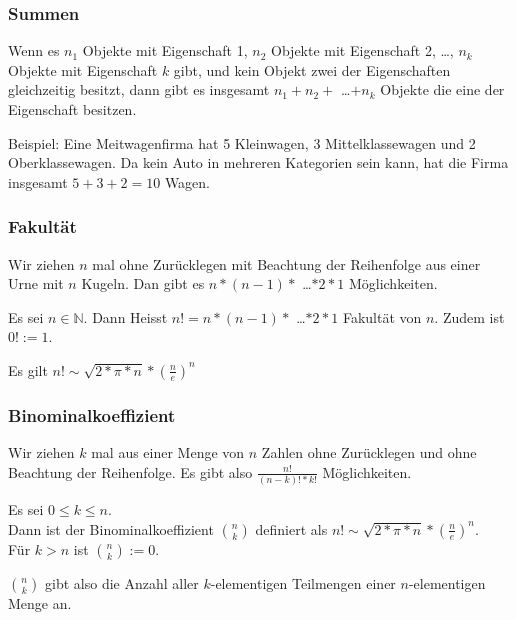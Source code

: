 \documentclass[10pt]{article}
\newtheorem[M]{definition}{Def.}
\newtheorem[M]{satz}{Satz}
\numberwithin{equation}{section}
\newcommand{\NN}{\mathbb{N}} %
\begin{document}
\subsubsection{Summen}
\begin{definition}[Summenregel]
Wenn es $n_1$ Objekte mit Eigenschaft 1, $n_2$ Objekte mit Eigenschaft 2, \dots, $n_k$ Objekte mit Eigenschaft $k$ gibt, und kein Objekt zwei der Eigenschaften gleichzeitig besitzt, dann gibt es insgesamt $n_1+n_2+$ \dots $+n_k$ Objekte die eine der Eigenschaft besitzen.
\end{definition}
Beispiel: Eine Meitwagenfirma hat 5 Kleinwagen, 3 Mittelklassewagen und 2 Oberklassewagen. Da kein Auto in mehreren Kategorien sein kann, hat die Firma insgesamt $5+3+2=10$ Wagen.

\subsubsection{Fakultät}
Wir ziehen $n$ mal ohne Zurücklegen mit Beachtung der Reihenfolge aus einer Urne mit $n$ Kugeln. Dan gibt es $n*(n-1)*$ \dots $*2*1$ Möglichkeiten.
\begin{definition}[Summenregel]
Es sei $n \in \NN$. Dann Heisst $n!=n*(n-1)*$ \dots $*2*1$ Fakultät von $n$. Zudem ist $0! := 1$. 
\end{definition}

Es gilt $n! \sim \sqrt{2*\pi*n}*(\frac{n}{e})^n$

\subsubsection{Binominalkoeffizient}
Wir ziehen $k$ mal aus einer Menge von $n$ Zahlen ohne Zurücklegen und ohne Beachtung der Reihenfolge. Es gibt also $\frac{n!}{(n-k)!*k!}$ Möglichkeiten.
\begin{definition}[Summenregel]
Es sei $0 \leq k \leq n$. \\
Dann ist der Binominalkoeffizient $\binom{n}{k}$ definiert als $n! \sim \sqrt{2*\pi*n}*(\frac{n}{e})^n$. \\
Für $k > n$ ist $\binom{n}{k} := 0$.
\end{definition}
$\binom{n}{k}$ gibt also die Anzahl aller $k$-elementigen Teilmengen einer $n$-elementigen Menge an.
\end{document}
